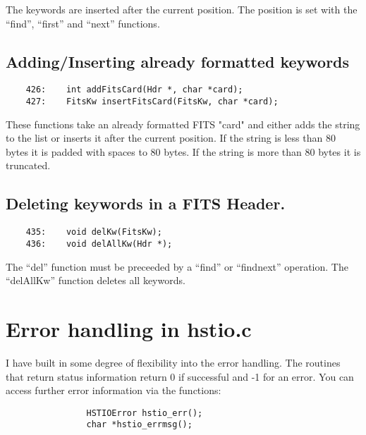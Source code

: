 The keywords are inserted after the current position.  The position
is set with the ``find'', ``first'' and ``next'' functions.

\subsection{ Adding/Inserting already formatted keywords }

\begin{scriptsize}
\begin{verbatim}
    426:    int addFitsCard(Hdr *, char *card);
    427:    FitsKw insertFitsCard(FitsKw, char *card);
\end{verbatim}
\end{scriptsize}

These functions take an already formatted FITS "card" and either adds
the string to the list or inserts it after the current position.  If
the string is less than 80 bytes it is padded with spaces to 80 bytes.
If the string is more than 80 bytes it is truncated.

\subsection{ Deleting keywords in a FITS Header. }

\begin{scriptsize}
\begin{verbatim}
    435:    void delKw(FitsKw);
    436:    void delAllKw(Hdr *);
\end{verbatim}
\end{scriptsize}

The ``del'' function must be preceeded by a ``find'' or ``findnext'' operation.
The ``delAllKw'' function deletes all keywords.

\section {
Error handling in hstio.c
}

I have built in some degree of flexibility into the error handling.
The routines that return status information return 0 if successful and
-1 for an error.  You can access further error information via the
functions: 

\begin{scriptsize}
\begin{verbatim}
                HSTIOError hstio_err();
                char *hstio_errmsg();
\end{verbatim}
\end{scriptsize}

